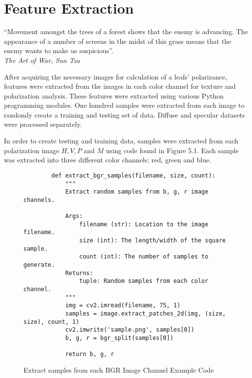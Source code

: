\chapter{Feature Extraction}
\begin{center}
  \begin{minipage}{0.75\textwidth}
    \begin{small}
      “Movement amongst the trees of a forest shows that the enemy is advancing.  The appearance of a number of screens in the midst of this grass means that the enemy wants to make us suspicious”.\\
      \null\hfill\emph{The Art of War, Sun Tzu}
    \end{small}
  \end{minipage}
  \vspace{0.5cm}
\end{center}

After acquiring the necessary images for calculation of a leafs' polarizance, features were extracted from the images in each color channel for texture and polarization analysis.  These features were extracted using various Python programming modules. One hundred samples were extracted from each image to randomly create a training and testing set of data.  Diffuse and specular datasets were processed separately.

In order to create testing and training data, samples were extracted from each polarization image $H, V, P$ and $M$ using code found in Figure 5.1.  Each sample was extracted into three different color channels; red, green and blue.

\begin{figure}
    \begin{lstlisting}
        def extract_bgr_samples(filename, size, count):
            """
            Extract random samples from b, g, r image channels.

            Args:
                filename (str): Location to the image filename.
                size (int): The length/width of the square sample.
                count (int): The number of samples to generate.
            Returns:
                tuple: Random samples from each color channel.
            """
            img = cv2.imread(filename, 75, 1)
            samples = image.extract_patches_2d(img, (size, size), count, 1)
            cv2.imwrite('sample.png', samples[0])
            b, g, r = bgr_split(samples[0])

            return b, g, r
    \end{lstlisting}
    \caption{Extract samples from each BGR Image Channel Example Code}
    \label{fig:scattering}
\end{figure}

